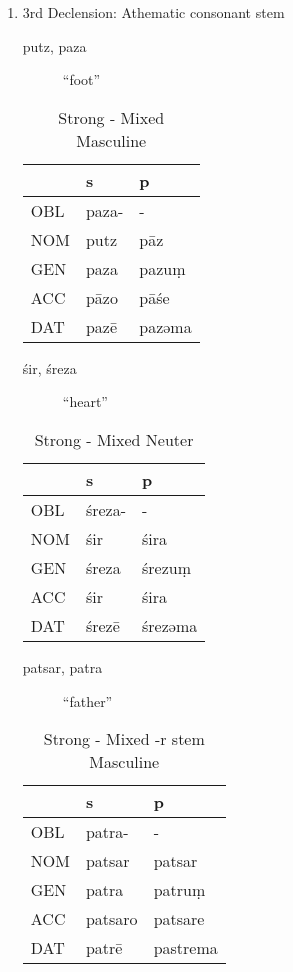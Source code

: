 \documentclass[11pt,a4paper]{article}
\begin{document}
\begin{enumerate}
\item 3rd Declension: Athematic consonant stem
\label{sec:org4c62025}
\begin{description}
\item[{putz, paza}] ``foot''
\end{description}
\begin{table}[htbp]
\caption{Strong - Mixed Masculine}
\centering
\begin{tabular}{lll}
 & s & p\\
\hline
OBL & paza- & -\\
NOM & putz & pāz\\
GEN & paza & pazuṃ\\
ACC & pāzo & pāśe\\
DAT & pazē & pazəma\\
\end{tabular}
\end{table}

\begin{description}
\item[{śir, śreza}] ``heart''
\end{description}
\begin{table}[htbp]
\caption{Strong - Mixed Neuter}
\centering
\begin{tabular}{lll}
 & s & p\\
\hline
OBL & śreza- & -\\
NOM & śir & śira\\
GEN & śreza & śrezuṃ\\
ACC & śir & śira\\
DAT & śrezē & śrezəma\\
\end{tabular}
\end{table}

\begin{description}
\item[{patsar, patra}] ``father''
\end{description}
\begin{table}[htbp]
\caption{Strong - Mixed -r stem Masculine}
\centering
\begin{tabular}{lll}
 & s & p\\
\hline
OBL & patra- & -\\
NOM & patsar & patsar\\
GEN & patra & patruṃ\\
ACC & patsaro & patsare\\
DAT & patrē & pastrema\\
\end{tabular}
\end{table}


\end{enumerate}
\end{document}
